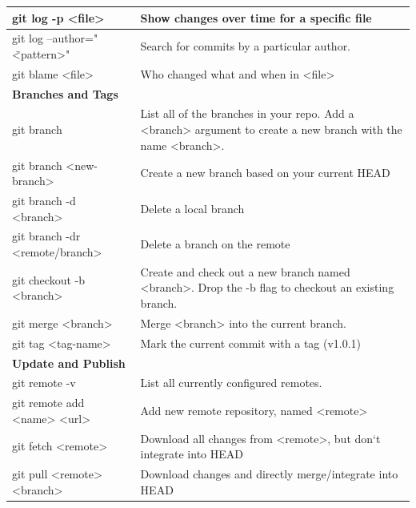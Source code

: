 \begin{longtable}{| p{} | p{} |}
	git log -p <file>&
	Show changes over time for a specific file 
	\\ \hline
	
	git log --author="\"<pattern>"&
	Search for commits by a particular author. 
	\\ \hline
	
	git blame <file>& 
	Who changed what and when in <file>
	\\ \hline \hline
	
	\textbf{Branches and Tags}&  
	\\ \hline
	
	\hline
	git branch&
	List all of the branches in your repo. Add a <branch> argument to
	create a new branch with the name <branch>.
	\\ \hline 
	
	git branch <new-branch>&
	Create a new branch based
	on your current HEAD
	\\ \hline
	
	git branch -d <branch>&
	Delete a local branch
	\\ \hline   
	
	git branch -dr <remote/branch>&
	Delete a branch on the remote
	\\ \hline
	
	git checkout -b <branch>&
	Create and check out a new branch named <branch>. Drop the -b
	flag to checkout an existing branch.
	\\ \hline 
	
	git merge <branch>&
	Merge <branch> into the current branch.
	\\ \hline
	
	git tag <tag-name>&
	Mark the current commit with a tag (v1.0.1)
	\\ \hline  \hline
	
	\textbf{Update and Publish}&
	\\\hline 
	
	\hline
	git remote -v&
	List all currently configured remotes.
	\\ \hline 
	
	git remote add <name> <url>& 
	Add new remote repository, named <remote>
	\\ \hline 
	
	git fetch <remote>&  
	Download all changes from <remote>,
	but don‘t integrate into HEAD
	\\ \hline
	
	git pull <remote> <branch>&
	Download changes and directly merge/integrate into HEAD  
	\\ \hline 
	

\end{longtable}
